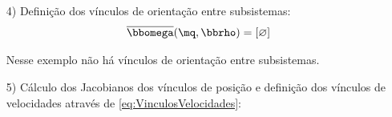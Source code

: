 \documentclass[a4paper,11pt,brazil,fleqn]{article}
\begin{document}
\begin{itemize}
V\'inculos de posi\c{c}\~ao:

\begin{equation}
\begin{cases}
\vct{\ttx_0}_{\ttN} = \vct{\ttx_1}_{\ttN} \\
\vct{\ttx_0}_{\ttN} = \vct{\ttx_2}_{\ttN} \\
\end{cases}
\Rightarrow
\begin{cases}
x = l_0 + l_1 \ccos_{1,1} + l_2 \ccos_{1,1\plus 2} \\
y = l_1 \ssin_{1,1} + l_2 \ssin_{1,1\plus 2} \\ 
x = -l_0 - l_1 \ccos_{2,1} - l_2 \ccos_{2,1\plus 2} \\
y = l_1 \ssin_{2,1} + l_2 \ssin_{2,1\plus 2} \\
\end{cases}
\end{equation}
\begin{equation}
\therefore \overline{\mq}(\mq) = 
\begin{bmatrix}
x - l_0 - l_1 \ccos_{1,1} - l_2 \ccos_{1,1\plus 2} \\
y - l_1 \ssin_{1,1} - l_2 \ssin_{1,1\plus 2} \\
x + l_0 + l_1 \ccos_{2,1} + l_2 \ccos_{2,1\plus 2} \\
y - l_1 \ssin_{2,1} - l_2 \ssin_{2,1\plus 2} \\
\end{bmatrix}
= \mzr
\end{equation}

\item[4)] Defini\c{c}\~ao dos v\'inculos de orienta\c{c}\~ao entre subsistemas:
\begin{equation}
\overline{\momega}(\mq,\mrho) = \vct{\varnothing}
\end{equation}

Nesse exemplo n\~ao h\'a v\'inculos de orienta\c{c}\~ao entre subsistemas.

\item[5)] C\'alculo dos Jacobianos dos v\'inculos de posi\c{c}\~ao e defini\c{c}\~ao dos v\'inculos de velocidades atrav\'es de \eqref{eq:VinculosVelocidades}:


\end{itemize}
\end{document}
